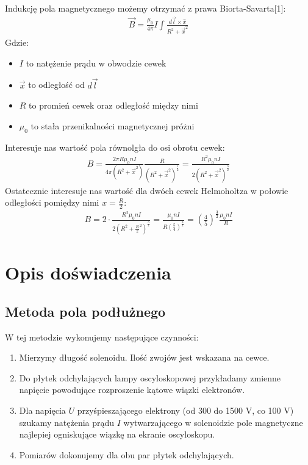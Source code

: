 \documentclass[paper=a4, fontsize=12pt]{scrartcl}
\begin{document}
Indukcję pola magnetycznego możemy otrzymać z  prawa Biorta-Savarta[1]:
\begin{align}
\vec{B}=\frac{\mu_0}{4\pi}I\int\frac{d\vec{l}\times \hat{x}}{R^2+\vec{x}^2}
\end{align}
Gdzie:
\begin{itemize}
	\item $I$ to natężenie prądu w obwodzie cewek
	\item $\vec{x}$ to odległość od $d\vec{l}$
	\item $R$ to promień cewek oraz odległość między nimi
	\item $\mu_0$ to stała przenikalności magnetycznej próżni
\end{itemize}
Interesuje nas wartość pola równolgła do osi obrotu cewek:
\begin{align*}
B=\frac{2\pi R\mu_0nI}{4\pi (R^2+\vec{x}^2)} \frac{R}{(R^2+\vec{x}^2)^\frac{1}{2}}=
\frac{ R^2\mu_0nI}{2(R^2+\vec{x}^2)^\frac{3}{2}}
\end{align*}
Ostatecznie interesuje nas wartość dla dwóch cewek Helmoholtza w połowie odległości pomiędzy nimi $x=\frac{R}{2}$:
\begin{align}
B=2\cdot
\frac{R^2\mu_0nI}{2(R^2+\frac{R}{2}^2)^\frac{3}{2}}=
\frac{\mu_0nI}{R(\frac{5}{4})^\frac{3}{2}}=
\left(\frac{4}{5}\right)^\frac{3}{2}\frac{\mu_0nI}{R}
\end{align}
\section{Opis doświadczenia}
\subsection{Metoda pola podłużnego}
W tej metodzie wykonujemy następujące czynności:
\begin{enumerate}
\item Mierzymy długość solenoidu. Ilość zwojów jest wskazana na cewce.
\item Do płytek odchylających lampy oscyloskopowej przykładamy zmienne napięcie powodujące rozproszenie kątowe wiązki elektronów.
\item Dla napięcia $U$ przyśpieszającego elektrony (od 300 do 1500 V, co 100 V) szukamy natężenia prądu $I$ wytwarzającego w solenoidzie pole magnetyczne najlepiej ogniskujące wiązkę na ekranie oscyloskopu. 
\item Pomiarów dokonujemy dla obu par płytek odchylających.
\end{enumerate}
\end{document}
